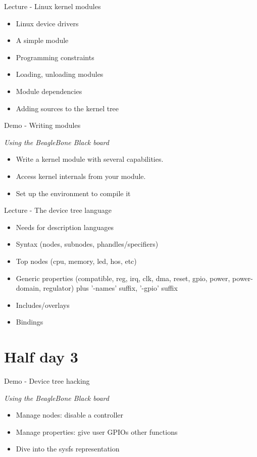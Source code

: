\documentclass[a4paper,12pt,obeyspaces,spaces,hyphens]{article}
\begin{document}
\feagendatwocolumn
{Lecture - Linux kernel modules}
{
  \begin{itemize}
  \item Linux device drivers
  \item A simple module
  \item Programming constraints
  \item Loading, unloading modules
  \item Module dependencies
  \item Adding sources to the kernel tree
  \end{itemize}
}
{Demo - Writing modules}
{
  {\em Using the BeagleBone Black board}
  \begin{itemize}
  \item Write a kernel module with several capabilities.
  \item Access kernel internals from your module.
  \item Set up the environment to compile it
  \end{itemize}
}

\feagendaonecolumn
{Lecture - The device tree language}
{
  \begin{itemize}
  \item Needs for description languages
  \item Syntax (nodes, subnodes, phandles/specifiers)
  \item Top nodes (cpu, memory, led, hos, etc)
  \item Generic properties
    (compatible, reg, irq, clk, dma, reset, gpio, power, power-domain, regulator)
    plus '-names' suffix, '-gpio' suffix
  \item Includes/overlays
  \item Bindings
  \end{itemize}
}

\section{Half day 3}

\feagendaonecolumn
{Demo - Device tree hacking}
{
  {\em Using the BeagleBone Black board}
  \begin{itemize}
  \item Manage nodes: disable a controller
  \item Manage properties: give user GPIOs other functions
  \item Dive into the sysfs representation
  \end{itemize}
}
\end{document}
